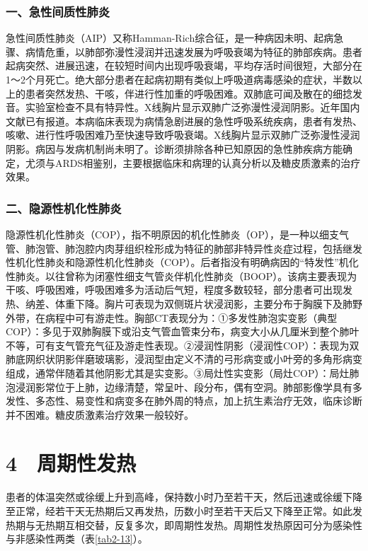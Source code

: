 \subsubsection{一、急性间质性肺炎}

急性间质性肺炎（AIP）又称Hamman-Rich综合征，是一种病因未明、起病急骤、病情危重，以肺部弥漫性浸润并迅速发展为呼吸衰竭为特征的肺部疾病。患者起病突然、进展迅速，在较短时间内出现呼吸衰竭，平均存活时间很短，大部分在1～2个月死亡。绝大部分患者在起病初期有类似上呼吸道病毒感染的症状，半数以上的患者突然发热、干咳，伴进行性加重的呼吸困难。双肺底可闻及散在的细捻发音。实验室检查不具有特异性。X线胸片显示双肺广泛弥漫性浸润阴影。近年国内文献已有报道。本病临床表现为病情急剧进展的急性呼吸系统疾病，患者有发热、咳嗽、进行性呼吸困难乃至快速导致呼吸衰竭。X线胸片显示双肺广泛弥漫性浸润阴影。病因与发病机制尚未明了。诊断须排除各种已知原因的急性肺疾病方能确定，尤须与ARDS相鉴别，主要根据临床和病理的认真分析以及糖皮质激素的治疗效果。

\subsubsection{二、隐源性机化性肺炎}

隐源性机化性肺炎（COP），指不明原因的机化性肺炎（OP），是一种以细支气管、肺泡管、肺泡腔内肉芽组织栓形成为特征的肺部非特异性炎症过程，包括继发性机化性肺炎和隐源性机化性肺炎（COP）。后者指没有明确病因的“特发性”机化性肺炎。以往曾称为闭塞性细支气管炎伴机化性肺炎（BOOP）。该病主要表现为干咳、呼吸困难，呼吸困难多为活动后气短，程度多数较轻，部分患者可出现发热、纳差、体重下降。胸片可表现为双侧斑片状浸润影，主要分布于胸膜下及肺野外带，在病程中可有游走性。胸部CT表现分为：①多发性肺泡实变影（典型COP）：多见于双肺胸膜下或沿支气管血管束分布，病变大小从几厘米到整个肺叶不等，可有支气管充气征及游走性表现。②浸润性阴影（浸润性COP）：表现为双肺底网织状阴影伴磨玻璃影，浸润型由定义不清的弓形病变或小叶旁的多角形病变组成，通常伴随着其他阴影尤其是实变影。③局灶性实变影（局灶COP）：局灶肺泡浸润影常位于上肺，边缘清楚，常呈叶、段分布，偶有空洞。肺部影像学具有多发性、多态性、易变性和病变多在肺外周的特点，加上抗生素治疗无效，临床诊断并不困难。糖皮质激素治疗效果一般较好。

\protect\hypertarget{text00030.html}{}{}

\section{4　周期性发热}

患者的体温突然或徐缓上升到高峰，保持数小时乃至若干天，然后迅速或徐缓下降至正常，经若干天无热期后又再发热，历数小时至若干天后又下降至正常。如此发热期与无热期互相交替，反复多次，即周期性发热。周期性发热原因可分为感染性与非感染性两类（表\ref{tab2-13}）。

